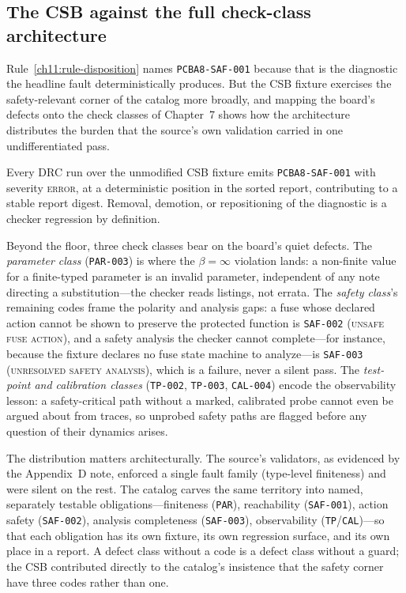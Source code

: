 \subsection{The CSB against the full check-class architecture}\label{ch11:checkarch}

Rule~\ref{ch11:rule-disposition} names \texttt{PCBA8-SAF-001} because that is the diagnostic the headline fault deterministically produces. But the CSB fixture exercises the safety-relevant corner of the catalog more broadly, and mapping the board's defects onto the check classes of Chapter~7 shows how the architecture distributes the burden that the source's own validation carried in one undifferentiated pass.

\begin{invariant}\label{ch11:inv-fixture}
Every DRC run over the unmodified CSB fixture emits \texttt{PCBA8-SAF-001} with severity \textsc{error}, at a deterministic position in the sorted report, contributing to a stable report digest. Removal, demotion, or repositioning of the diagnostic is a checker regression by definition.
\end{invariant}

Beyond the floor, three check classes bear on the board's quiet defects. The \emph{parameter class} (\texttt{PAR-003}) is where the $\beta=\infty$ violation lands: a non-finite value for a finite-typed parameter is an invalid parameter, independent of any note directing a substitution---the checker reads listings, not errata. The \emph{safety class}'s remaining codes frame the polarity and analysis gaps: a fuse whose declared action cannot be shown to preserve the protected function is \texttt{SAF-002} (\textsc{unsafe fuse action}), and a safety analysis the checker cannot complete---for instance, because the fixture declares no fuse state machine to analyze---is \texttt{SAF-003} (\textsc{unresolved safety analysis}), which is a failure, never a silent pass. The \emph{test-point and calibration classes} (\texttt{TP-002}, \texttt{TP-003}, \texttt{CAL-004}) encode the observability lesson: a safety-critical path without a marked, calibrated probe cannot even be argued about from traces, so unprobed safety paths are flagged before any question of their dynamics arises.

The distribution matters architecturally. The source's validators, as evidenced by the Appendix~D note, enforced a single fault family (type-level finiteness) and were silent on the rest. The catalog carves the same territory into named, separately testable obligations---finiteness (\texttt{PAR}), reachability (\texttt{SAF-001}), action safety (\texttt{SAF-002}), analysis completeness (\texttt{SAF-003}), observability (\texttt{TP}/\texttt{CAL})---so that each obligation has its own fixture, its own regression surface, and its own place in a report. A defect class without a code is a defect class without a guard; the CSB contributed directly to the catalog's insistence that the safety corner have three codes rather than one.

